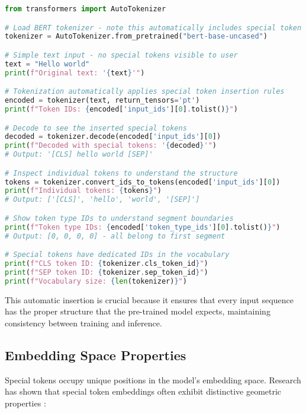 \begin{lstlisting}[language=Python, caption={Automatic special token insertion with detailed inspection}]
from transformers import AutoTokenizer

# Load BERT tokenizer - note this automatically includes special token rules
tokenizer = AutoTokenizer.from_pretrained("bert-base-uncased")

# Simple text input - no special tokens visible to user
text = "Hello world"
print(f"Original text: '{text}'")

# Tokenization automatically applies special token insertion rules
encoded = tokenizer(text, return_tensors='pt')
print(f"Token IDs: {encoded['input_ids'][0].tolist()}")

# Decode to see the inserted special tokens
decoded = tokenizer.decode(encoded['input_ids'][0])
print(f"Decoded with special tokens: '{decoded}'")
# Output: '[CLS] hello world [SEP]'

# Inspect individual tokens to understand the structure
tokens = tokenizer.convert_ids_to_tokens(encoded['input_ids'][0])
print(f"Individual tokens: {tokens}")
# Output: ['[CLS]', 'hello', 'world', '[SEP]']

# Show token type IDs to understand segment boundaries
print(f"Token type IDs: {encoded['token_type_ids'][0].tolist()}")
# Output: [0, 0, 0, 0] - all belong to first segment

# Special tokens have dedicated IDs in the vocabulary
print(f"CLS token ID: {tokenizer.cls_token_id}")
print(f"SEP token ID: {tokenizer.sep_token_id}")
print(f"Vocabulary size: {len(tokenizer)}")
\end{lstlisting}

This automatic insertion is crucial because it ensures that every input sequence has the proper structure that the pre-trained model expects, maintaining consistency between training and inference.

\subsection{Embedding Space Properties}

Special tokens occupy unique positions in the model's embedding space. Research has shown that special token embeddings often exhibit distinctive geometric properties \citep{clark2019what, rogers2020primer}:

